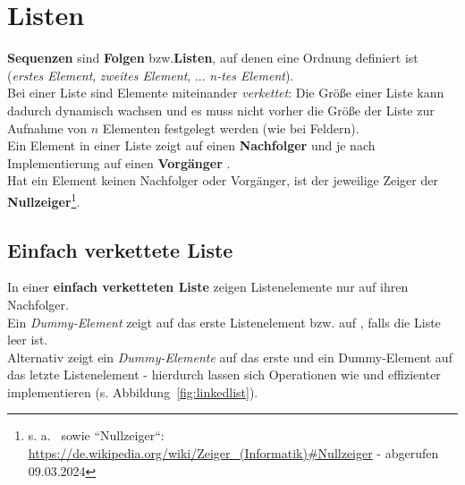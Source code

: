\section{Listen}

\textbf{Sequenzen} sind \textbf{Folgen} bzw.\textbf{Listen}, auf denen eine Ordnung definiert ist (\textit{erstes Element}, \textit{zweites Element}, ... \textit{n-tes Element}).\\

\noindent
Bei einer Liste sind Elemente miteinander \textit{verkettet}: Die Größe einer Liste kann dadurch dynamisch wachsen und es muss nicht vorher die Größe der Liste zur Aufnahme von $n$ Elementen festgelegt werden (wie bei Feldern).\\

\noindent
Ein Element in einer Liste zeigt auf einen \textbf{Nachfolger}  und je nach Implementierung auf einen \textbf{Vorgänger} .\\
Hat ein Element keinen Nachfolger oder Vorgänger, ist der jeweilige Zeiger der \textbf{Nullzeiger}\footnote{
s. a.~\cite[49 f.]{GD18b} sowie ``Nullzeiger``: \url{https://de.wikipedia.org/wiki/Zeiger_(Informatik)#Nullzeiger} - abgerufen 09.03.2024
}.

\subsection{Einfach verkettete Liste}
In einer \textbf{einfach verketteten Liste} zeigen Listenelemente nur auf ihren Nachfolger.\\

\noindent
Ein \textit{Dummy-Element}  zeigt auf das erste Listenelement bzw. auf , falls die Liste leer ist.\\

\noindent
Alternativ zeigt ein \textit{Dummy-Elemente}  auf das erste und ein Dummy-Element  auf das letzte Listenelement - hierdurch lassen sich Operationen wie  und  effizienter implementieren (s. Abbildung~\ref{fig:linkedlist}).

